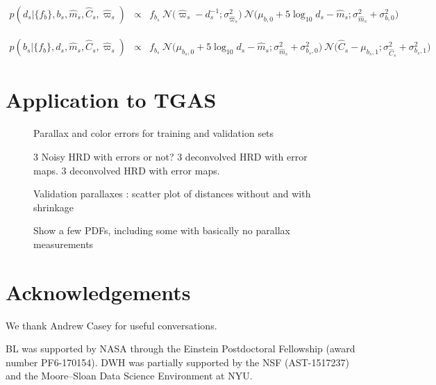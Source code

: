 \documentclass[aps,prd,showpacs,superscriptaddress,groupedaddress]{revtex4}  %
\newcommand{\eqn}[1]{\begin{eqnarray}#1\end{eqnarray}}
\begin{document}
\eqn{
	p\left(d_s \bigr\rvert \bigl\{ f_b \bigr\}, b_s, \hat{m}_s, \hat{C}_s, \hat{\varpi}_s\right) &\propto& f_{b_s} \ \mathcal{N}\bigl(\hat{\varpi}_s - d_s^{-1};\sigma_{\hat{\varpi}_s}^2 \bigr) \  \mathcal{N}\bigl( \mu_{b,0} + 5\log_{10}d_s  -\hat{m}_s ;\sigma_{\hat{m}_s}^2 + \sigma_{b,0}^2 \bigr) 
}


\eqn{
	p\left(b_s \bigr\rvert \bigl\{ f_b \bigr\}, d_s, \hat{m}_s, \hat{C}_s, \hat{\varpi}_s\right) &\propto& f_{b_s} \  \mathcal{N}\bigl( \mu_{b_s,0} + 5\log_{10}d_s  -\hat{m}_s ;\sigma_{\hat{m}_s}^2 + \sigma_{b_s,0}^2 \bigr) \  \mathcal{N}\bigl(\hat{C}_s - \mu_{b_s,1};\sigma_{\hat{C}_s}^2 + \sigma_{b_s,1}^2 \bigr)
}

\section{Application to TGAS}

\begin{figure}
\caption{Parallax and color errors for training and validation sets}
\end{figure}

\begin{figure}
\caption{3 Noisy HRD with errors or not? 3 deconvolved HRD with error maps. 3 deconvolved HRD with error maps. }
\end{figure}

\begin{figure}
\caption{Validation parallaxes : scatter plot of distances without and with shrinkage}
\end{figure}

\begin{figure}
\caption{Show a few PDFs, including some with basically no parallax measurements}
\end{figure}


\section{Acknowledgements}

We thank Andrew Casey for useful conversations.

BL was supported by NASA through the Einstein Postdoctoral Fellowship (award number PF6-170154).
DWH was partially supported by the NSF (AST-1517237) and the Moore--Sloan Data Science Environment at NYU.




\appendix

\end{document}
